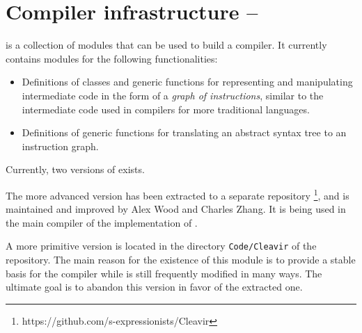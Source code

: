 \chapter{Compiler infrastructure -- \cleavir{}}

\cleavir{} is a collection of modules that can be used to build a
\commonlisp{} compiler.  It currently contains modules for the
following functionalities:

\begin{itemize}
\item Definitions of classes and generic functions for representing
  and manipulating intermediate code in the form of a \emph{graph of
    instructions}, similar to the intermediate code used in compilers
  for more traditional languages.
\item Definitions of generic functions for translating an abstract
  syntax tree to an instruction graph.
\end{itemize}

Currently, two versions of \cleavir{} exists.

The more advanced version has been extracted to a separate repository%
\footnote{https://github.com/s-expressionists/Cleavir}, and is
maintained and improved by Alex Wood and Charles Zhang.  It is being
used in the main compiler of the \clasp{} implementation of
\commonlisp{}.

A more primitive version is located in the directory
\texttt{Code/Cleavir} of the \sysname{} repository.  The main reason
for the existence of this module is to provide a stable basis for the
\sysname{} compiler while \sysname{} is still frequently modified in
many ways.  The ultimate goal is to abandon this version in favor of
the extracted one.
